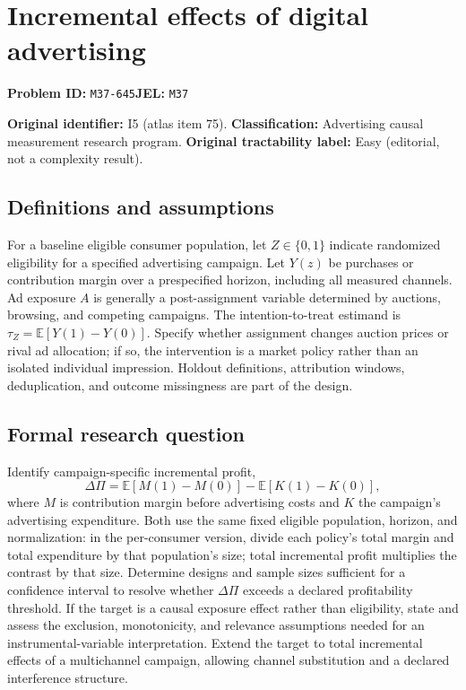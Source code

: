 \documentclass[11pt,a4paper]{article}
\begin{document}
\section*{Incremental effects of digital advertising}
\textbf{Problem ID:} \texttt{M37-645}\quad \textbf{JEL:} \texttt{M37}\par
\label{problem:OP-0075}
\label{atlas:prob:I5}

\noindent\textbf{Original identifier:} I5 (atlas item 75). \textbf{Classification:} Advertising causal measurement research program. \textbf{Original tractability label:} Easy (editorial, not a complexity result).

\subsection*{Definitions and assumptions}

For a baseline eligible consumer population, let $Z\in\{0,1\}$ indicate randomized eligibility for a specified advertising campaign. Let $Y(z)$ be purchases or contribution margin over a prespecified horizon, including all measured channels. Ad exposure $A$ is generally a post-assignment variable determined by auctions, browsing, and competing campaigns. The intention-to-treat estimand is $\tau_Z=\mathbb E[Y(1)-Y(0)]$. Specify whether assignment changes auction prices or rival ad allocation; if so, the intervention is a market policy rather than an isolated individual impression. Holdout definitions, attribution windows, deduplication, and outcome missingness are part of the design.

\subsection*{Formal research question}

Identify campaign-specific incremental profit,
\[
\Delta\Pi=\mathbb E[M(1)-M(0)]-\mathbb E[K(1)-K(0)],
\]
where $M$ is contribution margin before advertising costs and $K$ the campaign's advertising expenditure. Both use the same fixed eligible population, horizon, and normalization: in the per-consumer version, divide each policy's total margin and total expenditure by that population's size; total incremental profit multiplies the contrast by that size. Determine designs and sample sizes sufficient for a confidence interval to resolve whether $\Delta\Pi$ exceeds a declared profitability threshold. If the target is a causal exposure effect rather than eligibility, state and assess the exclusion, monotonicity, and relevance assumptions needed for an instrumental-variable interpretation. Extend the target to total incremental effects of a multichannel campaign, allowing channel substitution and a declared interference structure.
\end{document}
